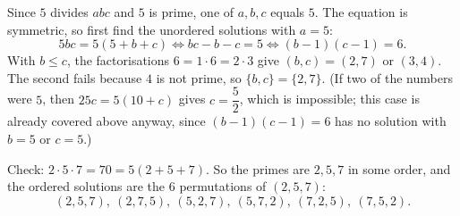 Since $5$ divides $abc$ and $5$ is prime, one of $a,b,c$ equals $5$. The equation is symmetric, so first find the unordered solutions with $a=5$:
\[
5bc=5(5+b+c)\iff bc-b-c=5\iff (b-1)(c-1)=6 .
\]
With $b\le c$, the factorisations $6=1\cdot6=2\cdot3$ give $(b,c)=(2,7)$ or $(3,4)$. The second fails because $4$ is not prime, so $\{b,c\}=\{2,7\}$. (If two of the numbers were $5$, then $25c=5(10+c)$ gives $c=\dfrac{5}{2}$, which is impossible; this case is already covered above anyway, since $(b-1)(c-1)=6$ has no solution with $b=5$ or $c=5$.)

Check: $2\cdot5\cdot7=70=5(2+5+7)$. So the primes are $2,5,7$ in some order, and the ordered solutions are the $\boxed{6}$ permutations of $(2,5,7)$:
\[
(2,5,7),\ (2,7,5),\ (5,2,7),\ (5,7,2),\ (7,2,5),\ (7,5,2).
\]
